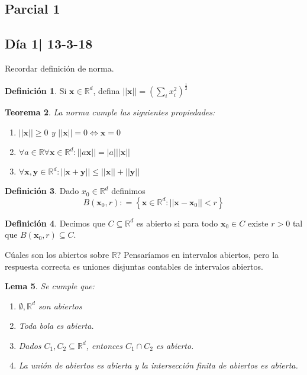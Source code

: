 \documentclass[12pt]{article}
\theoremstyle{plain}
\newtheorem{Th}{Teorema}[subsection]   %
\newtheorem{Lem}[Th]{Lema}             %
\theoremstyle{definition}
\newtheorem{Def}[Th]{Definición}       %
\theoremstyle{remark}
\numberwithin{equation}{section}
\newcommand{\bR}{\mathbb{R}}        %
\renewcommand{\geq}{\geqslant}      %
\renewcommand{\leq}{\leqslant}      %
\renewcommand{\:}{\colon}           %
\renewcommand{\vec}[1]{\mathbf{#1}}
\newcommand{\vx}{\vec{x}}           %
\newcommand{\vy}{\vec{y}}
\newcommand{\conj}[1]{\left\lbrace#1\right\rbrace}
\begin{document}
\begin{multicols}{2}

\section{Parcial 1}
\subsection{Día 1| 13-3-18}
Recordar definición de norma.
\begin{Def}
Si $\vec{x}\in\bR^d$, defina $||\vec{x}||=\left(\sum_{i}x_i^2\right)^{\frac{1}{2}}$
\end{Def}

\begin{Th}
La norma cumple las siguientes propiedades:
\begin{enumerate}
  \item $||\vec{x}||\geq 0$ y $||\vec{x}|| = 0\iff \vec{x}= 0$
  \item $\forall a\in\bR\forall \vx\in\bR^d: ||a\vec{x}|| = |a|||\vec{x}||$
  \item $\forall \vx,\vy \in\bR^d : ||\vec{x}+\vec{y}||\leq ||\vec{x}||+||\vec{y}||$
\end{enumerate}
\end{Th}

\begin{Def}
  Dado $x_0\in\bR^d$ definimos $$B(\vx_0,r)\colon = \conj{\vx\in\bR^d: ||\vx-\vx_0||< r}$$
\end{Def}

\begin{Def}
 Decimos que $C\subseteq\bR^d$ es abierto si para todo $\vx_0\in C$ existe $r>0$ tal que $B(\vx_0,r)\subseteq C$.
\end{Def}
Cúales son los abiertos sobre $\bR$? Pensaríamos en intervalos abiertos, pero la respuesta correcta es uniones disjuntas contables de intervalos abiertos.

\begin{Lem}\label{pabiertos}
Se cumple que:
  \begin{enumerate}
    \item $\emptyset, \bR^d$ son abiertos
    \item Toda bola es abierta.
    \item Dados $C_1,C_2\subseteq \bR^d$, entonces $C_1\cap C_2$ es abierto.
    \item La unión de abiertos es abierta y la intersección finita de abiertos es abierta.
  \end{enumerate}
\end{Lem}


\end{multicols}
\end{document}
